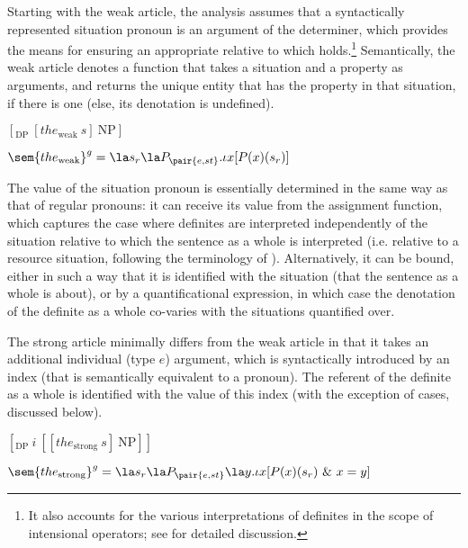 \documentclass[output=paper
,modfonts
,nonflat]{langscibook}
\begin{document}
Starting with the weak article, the analysis assumes that a
syntactically represented situation pronoun is an argument of the
determiner, which provides the means for ensuring an appropriate
 relative to which  holds.\footnote{It also
accounts for the various interpretations of definites in the scope of
intensional operators; see \citep{Schwarz2009} for detailed
discussion.} Semantically, the weak article denotes a function that
takes a situation and a property as arguments, and returns the unique
entity that has the property in that situation, if there is one (else,
its denotation is undefined).

\begin{exe}
\ex\label{ex:schwarz:13}
\begin{xlist}
\ex\label{ex:schwarz:13a} $ [ _{\text{DP}}\ [the_{\text{weak}}\ s]\ \text{NP}]$

\ex\label{ex:schwarz:13b} $\sem{the_{\text{weak}}}^g = \la s_r\la P_{\pair{e,st}}.\iota x
[P(x)(s_r)]$ 
\end{xlist}
\end{exe}

The value of the situation pronoun is essentially determined in the
same way as that of regular pronouns: it can receive its value from
the assignment function, which captures the case where definites are
interpreted independently of the situation relative to which the
sentence as a whole is interpreted (i.e. relative to a resource
situation, following the terminology of
\citealt{Fintel1994}). Alternatively, it can be bound, either in such
a way that it is identified with the  situation (that the
sentence as a whole is about), or by a quantificational expression, in
which case the denotation of the definite as a whole co-varies with
the situations quantified over.

The strong article minimally differs from the weak article in that it
takes an additional individual (type $e$) argument, which is
syntactically introduced by an index (that is semantically equivalent
to a pronoun). The referent of the definite as a whole is identified
with the value of this index (with the exception of  cases,
discussed below). 

\begin{exe}
\ex\label{ex:schwarz:14}
\begin{xlist}
\ex\label{ex:schwarz:14a} $ [ _{\text{DP}}\ i\ [[the_{\text{strong}}\ s]\ \text{NP}]]$

\ex\label{ex:schwarz:14b} $\sem{the_{\text{strong}}}^g = \la s_r\la P_{\pair{e,st}}\la
y.\iota x [P(x)(s_r)\ \&\ x=y]$
\end{xlist}
\end{exe}
\end{document}
